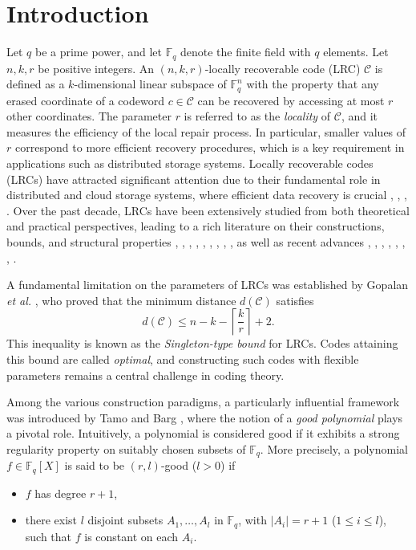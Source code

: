 \documentclass[1p,final]{elsarticle}
\newtheorem{open problem}[theorem]{Open Problem}
\begin{document}
	\section{Introduction}
	Let $q$ be a prime power, and let $\mathbb{F}_q$ denote the finite field with $q$ elements. Let $n,k,r$ be positive integers. An $(n,k,r)$-locally recoverable code (LRC) $\mathcal{C}$ is defined as a $k$-dimensional linear subspace of $\mathbb{F}_{q}^{n}$ with the property that any erased coordinate of a codeword $c \in \mathcal{C}$ can be recovered by accessing at most $r$ other coordinates. 
The parameter $r$ is referred to as the \emph{locality} of $\mathcal{C}$, and it measures the efficiency of the local repair process. In particular, smaller values of $r$ correspond to more efficient recovery procedures, which is a key requirement in applications such as distributed storage systems. Locally recoverable codes (LRCs) have attracted significant attention due to their fundamental role in distributed and cloud storage systems, where efficient data recovery is crucial \cite{BargTamoVladut2015}, \cite{Gopalan H S Y2012}, \cite{Micheli 2020}, \cite{Tamo Barg 2014}. Over the past decade, LRCs have been extensively studied from both theoretical and practical perspectives, leading to a rich literature on their constructions, bounds, and structural properties \cite{Cadambe Mazumdar2015}, \cite{Cai Miao Schwartz Tang}, \cite{Duke F M2022}, \cite{Jin Ma Xing 2020}, \cite{Li Ma Xing2019}, \cite{Luo Cao 2021}, \cite{Micheli 2020}, \cite{Tamo Papailiopoulos2016}, \cite{Xing Yuan 2022}, as well as recent advances \cite{Fang Tao Fu Chen Xia}, \cite{Heng2024}, \cite{Heng2025}, \cite{Luo Ezerman Ling2023}, \cite{Luo Chen Ezerman Ling2025}, \cite{Ma Xing 2023}, \cite{Sharma2025}, \cite{Tan2023}.

A fundamental limitation on the parameters of LRCs was established by Gopalan \textit{et al.} \cite{Gopalan H S Y2012}, who proved that the minimum distance $d\left (  \mathcal{C} \right )$ satisfies
\[
d\left (  \mathcal{C} \right ) \leqslant n - k - \left\lceil \frac{k}{r} \right\rceil + 2.
\]
This inequality is known as the \emph{Singleton-type bound} for LRCs. Codes attaining this bound are called \emph{optimal}, and constructing such codes with flexible parameters remains a central challenge in coding theory.

\medskip

Among the various construction paradigms, a particularly influential framework was introduced by Tamo and Barg \cite{Tamo Barg 2014}, where the notion of a \emph{good polynomial} plays a pivotal role. Intuitively, a polynomial is considered good if it exhibits a strong regularity property on suitably chosen subsets of $\mathbb{F}_q$. More precisely, a polynomial $f\in \mathbb{F}_q[X]$ is said to be $(r,l)$-good ($l>0$) if 
\begin{itemize}
	\item $f$ has degree $r+1$,
	\item there exist $l$ disjoint subsets $A_{1},\ldots, A_{l}$ in $\mathbb{F}_q$, with $|A_{i}|=r+1$ ($1\le i\le l$), such that $f$ is constant on each $A_{i}$.
\end{itemize} 
\end{document}
